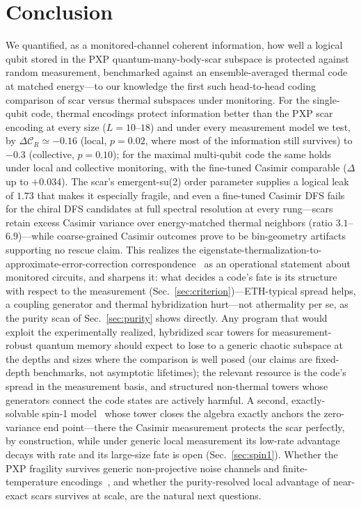 \documentclass[a4paper,11pt,twocolumn,unpublished]{quantumarticle}
\newcommand{\CR}{\mathcal{C}_R}
\begin{document}
\section{Conclusion}

We quantified, as a monitored-channel coherent information, how well a logical
qubit stored in the PXP quantum-many-body-scar subspace is protected against
random measurement, benchmarked against an ensemble-averaged thermal code at
matched energy---to our knowledge the first such head-to-head coding comparison
of scar versus thermal subspaces under monitoring.
For the single-qubit code, thermal encodings protect information better than
the PXP scar encoding at every size ($L=10$--$18$) and under every measurement
model we test, by $\Delta\CR\simeq-0.16$ (local, $p=0.02$, where most of the
information still survives) to $-0.3$ (collective, $p=0.10$); for the maximal
multi-qubit code the same holds under local and collective monitoring, with
the fine-tuned Casimir comparable ($\Delta$ up to $+0.034$). The scar's
emergent-su(2) order parameter supplies a logical leak of $1.73$ that makes it
especially fragile, and even a fine-tuned Casimir DFS
fails for the chiral DFS candidates at full spectral resolution at every
rung---scars retain excess Casimir variance over energy-matched thermal
neighbors (ratio $3.1$--$6.9$)---while coarse-grained Casimir outcomes
prove to be bin-geometry artifacts supporting no rescue claim.
This realizes the eigenstate-thermalization-to-approximate-error-correction
correspondence~\cite{Brandao2019,BaoCheng2019,Qasim2025} as an operational statement about monitored
circuits, and sharpens it: what decides a code's fate is its structure with
respect to the measurement (Sec.~\ref{sec:criterion})---ETH-typical spread
helps, a coupling generator and thermal hybridization hurt---not
athermality per se, as the purity scan of Sec.~\ref{sec:purity} shows
directly.
Any program that would exploit the experimentally realized, hybridized scar
towers for measurement-robust
quantum memory should expect to lose to a generic chaotic subspace at the
depths and sizes where the comparison is well posed (our claims are
fixed-depth benchmarks, not asymptotic lifetimes); the relevant
resource is the code's spread in the measurement basis, and structured
non-thermal towers whose generators connect the code states are actively
harmful.
A second, exactly-solvable spin-1 model~\cite{Schecter2019} whose tower closes
the algebra exactly anchors the zero-variance end point---there the
Casimir measurement protects the scar perfectly, by construction, while under
generic local measurement its low-rate advantage decays with rate and its
large-size fate is open (Sec.~\ref{sec:spin1}). Whether the PXP fragility
survives generic non-projective
noise channels and finite-temperature encodings~\cite{Moudgalya2018,Moudgalya2022},
and whether the purity-resolved local advantage of near-exact scars survives
at scale, are the natural next questions.
\end{document}

